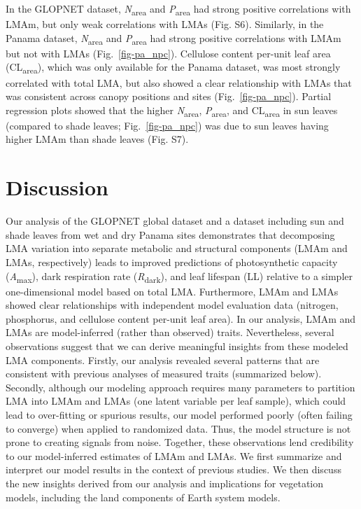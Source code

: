 \documentclass[
  12pt,
  letterpaper,
  DIV=11,
  numbers=noendperiod]{scrartcl}
\providecommand{\DIFadd}[1]{{\protect\color{blue}\uwave{#1}}} %
\providecommand{\DIFaddbegin}{} %
\providecommand{\DIFaddend}{} %
\newcommand{\DIFaddincludegraphics}[2][]{{\color{blue}\fbox{\DIFOincludegraphics[#1]{#2}}}} %
\DeclareRobustCommand{\DIFaddbegin}{\DIFOaddbegin \let\includegraphics\DIFaddincludegraphics} %
\DeclareRobustCommand{\DIFaddend}{\DIFOaddend \let\includegraphics\DIFOincludegraphics} %
\begin{document}
In the GLOPNET dataset, \emph{N}\textsubscript{area} and
\emph{P}\textsubscript{area} had strong positive correlations with LMAm,
but only weak correlations with LMAs (Fig. S6). Similarly, in the Panama
dataset, \emph{N}\textsubscript{area} and \emph{P}\textsubscript{area}
had strong positive correlations with LMAm but not with LMAs
(Fig.~\ref{fig-pa_npc}). Cellulose content per-unit leaf area
(CL\textsubscript{area}), which was only available for the Panama
dataset, was most strongly correlated with total LMA, but also showed a
clear relationship with LMAs that was consistent across canopy positions
and sites (Fig.~\ref{fig-pa_npc}). Partial regression plots showed that
the higher \emph{N}\textsubscript{area}, \emph{P}\textsubscript{area},
and CL\textsubscript{area} in sun leaves (compared to shade leaves;
Fig.~\ref{fig-pa_npc}) was \DIFaddbegin \DIFadd{primarily }\DIFaddend due to sun leaves having higher
LMAm than shade leaves (Fig. S7).

\section{Discussion}\label{discussion}

Our analysis of the GLOPNET global dataset and a dataset including sun
and shade leaves from wet and dry Panama sites demonstrates that
decomposing LMA variation into separate metabolic and structural
components (LMAm and LMAs, respectively) leads to improved predictions
of photosynthetic capacity (\emph{A}\textsubscript{max}), dark
respiration rate (\emph{R}\textsubscript{dark}), and leaf lifespan (LL)
relative to a simpler one-dimensional model based on total LMA.
Furthermore, LMAm and LMAs showed clear relationships with independent
model evaluation data (nitrogen, phosphorus, and cellulose content
per-unit leaf area). In our analysis, LMAm and LMAs are model-inferred
(rather than observed) traits. Nevertheless, several observations
suggest that we can derive meaningful insights from these modeled LMA
components. Firstly, our analysis revealed several patterns that are
consistent with previous analyses of measured traits (summarized below).
Secondly, although our modeling approach requires many parameters to
partition LMA into LMAm and LMAs (one latent variable per leaf sample),
which could lead to over-fitting or spurious results, our model
performed poorly (often failing to converge) when applied to randomized
data. Thus, the model structure is not prone to creating signals from
noise. Together, these observations lend credibility to our
model-inferred estimates of LMAm and LMAs. We first summarize and
interpret our model results in the context of previous studies. We then
discuss the new insights derived from our analysis and implications for
vegetation models, including the land components of Earth system models.
\end{document}

